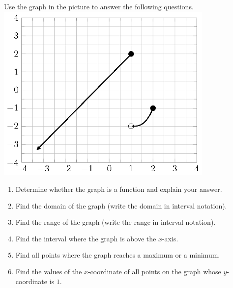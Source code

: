 \begin{exercise}

Use the graph in the picture to answer the following questions.
\\
\includegraphics[width=0.8\textwidth]{figs/function-exercise-ray-cubic.png}

\begin{enumerate}[twocol]
\item
  Determine whether the graph is a function and explain your answer.
\item
  Find the domain of the graph (write the domain in interval notation).
\item
  Find the range of the graph (write the range in interval notation).

  \columnbreak

\item
  Find the interval where the graph is above the \(x\)-axis.
\item
  Find all points where the graph reaches a maximum or a minimum.
\item
  Find the values of the \(x\)-coordinate of all points on the graph
  whose \(y\)-coordinate is \(1\).
\end{enumerate}
\end{exercise}
\vspace*{2\baselineskip}

